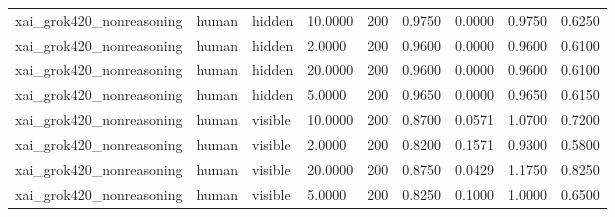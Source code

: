 \begin{tabular}{lllllllll}
xai\_grok420\_nonreasoning & human & hidden & 10.0000 & 200 & 0.9750 & 0.0000 & 0.9750 & 0.6250 \\
xai\_grok420\_nonreasoning & human & hidden & 2.0000 & 200 & 0.9600 & 0.0000 & 0.9600 & 0.6100 \\
xai\_grok420\_nonreasoning & human & hidden & 20.0000 & 200 & 0.9600 & 0.0000 & 0.9600 & 0.6100 \\
xai\_grok420\_nonreasoning & human & hidden & 5.0000 & 200 & 0.9650 & 0.0000 & 0.9650 & 0.6150 \\
xai\_grok420\_nonreasoning & human & visible & 10.0000 & 200 & 0.8700 & 0.0571 & 1.0700 & 0.7200 \\
xai\_grok420\_nonreasoning & human & visible & 2.0000 & 200 & 0.8200 & 0.1571 & 0.9300 & 0.5800 \\
xai\_grok420\_nonreasoning & human & visible & 20.0000 & 200 & 0.8750 & 0.0429 & 1.1750 & 0.8250 \\
xai\_grok420\_nonreasoning & human & visible & 5.0000 & 200 & 0.8250 & 0.1000 & 1.0000 & 0.6500 \\
\bottomrule
\end{tabular}
